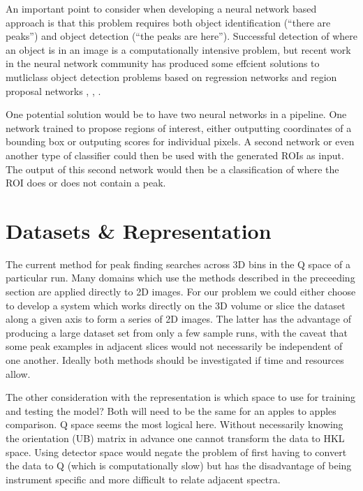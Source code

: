 \documentclass[paper=a4, fontsize=8pt]{scrartcl} \usepackage[T1]{fontenc}
\begin{document}
An important point to consider when developing a neural network based approach is that this 
problem requires both object identification (``there are peaks'') and object 
detection (``the peaks are here''). Successful detection of where an object
is in an image is a computationally intensive problem, but recent work in the 
neural network community has produced some effcient solutions to mutliclass object detection problems
based on regression networks \cite{sermanet2013overfeat} and region proposal 
networks \cite{kiapour2014materials}, \cite{girshick2014rich}, \cite{renNIPS15fasterrcnn}.

One potential solution would be to have two neural networks in a pipeline. One 
network trained to propose regions of interest, either outputting coordinates of
a bounding box or outputing scores for individual pixels. A second network or
even another type of classifier could then be used with the generated ROIs as input.
The output of this second network would then be a classification of where the ROI
does or does not contain a peak.

\section{Datasets \& Representation}
\label{sec:data}
The current method for peak finding searches across 3D bins in the Q space of a 
particular run. Many domains which use the methods described in the preceeding section are applied 
directly to 2D images. For our problem we could either choose to develop a 
system which works directly on the 3D volume or slice the dataset
along a given axis to form a series of 2D images. The latter has the advantage 
of producing a large dataset set from only a few sample runs, with the 
caveat that some peak examples in adjacent slices would not necessarily be 
independent of one another. Ideally both methods should be investigated if time
and resources allow.

The other consideration with the representation is which space to use for
training and testing the model? Both will need to be the same for an apples to 
apples comparison. Q space seems the most logical here. Without necessarily 
knowing the orientation (UB) matrix in advance one cannot transform the data to HKL space. 
Using detector space would negate the problem of first having to convert the
data to Q (which is computationally slow) but has the disadvantage of being 
instrument specific and more difficult to relate adjacent spectra.
\end{document}
